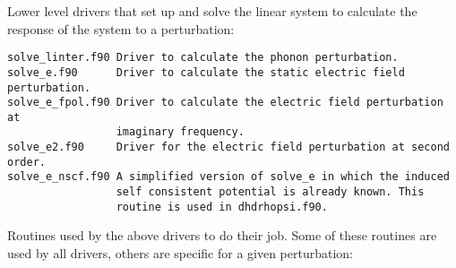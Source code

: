 \documentclass[12pt,a4paper]{article}
\begin{document}
Lower level drivers that set up and solve the linear system to calculate
the response of the system to a perturbation:

\begin{verbatim}
solve_linter.f90 Driver to calculate the phonon perturbation.
solve_e.f90      Driver to calculate the static electric field perturbation.
solve_e_fpol.f90 Driver to calculate the electric field perturbation at 
                 imaginary frequency.
solve_e2.f90     Driver for the electric field perturbation at second order.
solve_e_nscf.f90 A simplified version of solve_e in which the induced
                 self consistent potential is already known. This 
                 routine is used in dhdrhopsi.f90.
\end{verbatim}

Routines used by the above drivers to do their job. Some of these routines
are used by all drivers, others are specific for a given perturbation:
\end{document}
